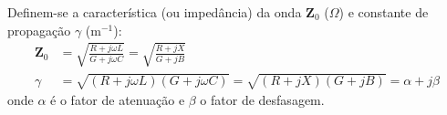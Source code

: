 



\noindent Definem-se a característica (ou impedância) da onda $\mathbf{Z}_0$ ($\Omega$) e constante de propagação $\gamma$ (m$^{-1}$):
$$
    \begin{aligned}
        \mathbf{Z}_0 &= \sqrt{\frac{R + j\omega L}{G + j\omega C}} = \sqrt{\frac{R + jX}{G + jB}} \\
        \gamma &= \sqrt{(R + j\omega L)(G + j\omega C)} = \sqrt{(R + jX)(G + jB)} = \alpha + j\beta
    \end{aligned}
$$
onde $\alpha$ é o fator de atenuação e $\beta$ o fator de desfasagem. 

